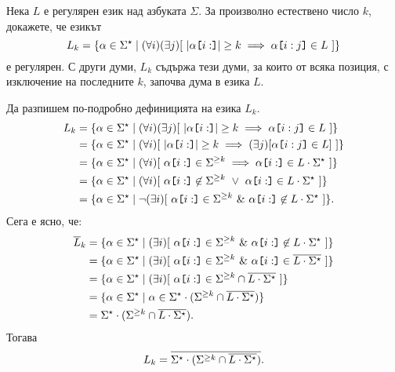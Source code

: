 \begin{extra}
\begin{problem}
  Нека $L$ е регулярен език над азбуката $\Sigma$.
  За произволно естествено число $k$, докажете, че езикът
  \[L_k = \{ \alpha \in \Sigma^\star \mid (\forall i)(\exists j)[\ |\alpha\texttt{[}{i:}\texttt{]}| \geq k \implies \alpha\texttt{[}{i:j}\texttt{]} \in L\ ]\}\]
  е регулярен.
  С други думи, $L_k$ съдържа тези думи, за които от всяка позиция, с изключение на последните $k$, започва дума в езика $L$.
\end{problem}
\begin{hint}
  Да разпишем по-подробно дефиницията на езика $L_k$.
  \begin{align*}
    L_k & = \{ \alpha \in \Sigma^\star \mid (\forall i)(\exists j)[\ |\alpha\slice{i:}| \geq k \implies \alpha\slice{i:j} \in L\ ]\}\\
        & = \{ \alpha \in \Sigma^\star \mid (\forall i)[\ |\alpha\slice{i:}| \geq k \implies (\exists j)[\alpha\slice{i:j} \in L]\ ]\}\\
        & = \{ \alpha \in \Sigma^\star \mid (\forall i)[\ \alpha\slice{i:} \in \Sigma^{\geq k} \implies \alpha\slice{i:} \in L \cdot \Sigma^\star\ ]\}\\
        & = \{ \alpha \in \Sigma^\star \mid (\forall i)[\ \alpha\slice{i:} \not\in \Sigma^{\geq k}\ \lor\ \alpha\slice{i:} \in L \cdot \Sigma^\star\ ]\}\\
        & = \{ \alpha \in \Sigma^\star \mid \neg (\exists i)[\ \alpha\slice{i:} \in \Sigma^{\geq k}\ \&\ \alpha\slice{i:} \not\in L \cdot \Sigma^\star\ ]\}.
  \end{align*}
  Сега е ясно, че:
  \begin{align*}
    \ov{L}_k & = \{ \alpha \in \Sigma^\star \mid (\exists i)[\ \alpha\slice{i:} \in \Sigma^{\geq k}\ \&\ \alpha\slice{i:} \not\in L \cdot \Sigma^\star\ ]\}\\
             & = \{ \alpha \in \Sigma^\star \mid (\exists i)[\ \alpha\slice{i:} \in \Sigma^{\geq k}\ \&\ \alpha\slice{i:} \in \ov{L \cdot \Sigma^\star}\ ]\}\\
             & = \{ \alpha \in \Sigma^\star \mid (\exists i)[\ \alpha\slice{i:} \in \Sigma^{\geq k} \cap \ov{L \cdot \Sigma^\star}\ ]\}\\
             & = \{ \alpha \in \Sigma^\star \mid \alpha \in \Sigma^\star \cdot (\Sigma^{\geq k} \cap \ov{L \cdot \Sigma^\star}) \}\\
             & = \Sigma^\star \cdot (\Sigma^{\geq k} \cap \ov{L \cdot \Sigma^\star}).
  \end{align*}
  Тогава
  \[L_k = \overline{\Sigma^\star \cdot (\Sigma^{\geq k} \cap \overline{L \cdot \Sigma^\star})}.\]
\end{hint}

\end{extra}


